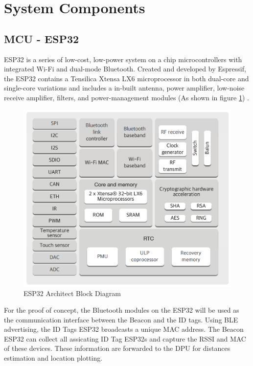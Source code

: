 

\setcounter{section}{2}
\section{System Components}
\bigskip

\subsection{MCU - ESP32}
\medskip
ESP32 is a series of low-cost, low-power system on a chip microcontrollers with integrated Wi-Fi and dual-mode Bluetooth. Created and developed by Espressif, the ESP32 contains a Tensilica Xtensa LX6 microprocessor in both dual-core and single-core variations and includes a in-built antenna, power amplifier, low-noise receive amplifier, filters, and power-management modules (As shown in figure \ref{esp_core}) \cite{R3-1-1}. 

\medskip
\begin{figure}[H]
\centering
    \includegraphics[scale=0.4]{./images/esp_core.png}
    \caption{ESP32 Architect Block Diagram}
    \label{esp_core}
\end{figure}

For the proof of concept, the Bluetooth modules on the ESP32 will be used as the communication interface between the Beacon and the ID tags. Using BLE advertising, the ID Tags ESP32 broadcasts a unique MAC address. The Beacon ESP32 can collect all assicating ID Tag ESP32s and capture the RSSI and MAC of these devices. These information are forwarded to the DPU for distances estimation and location plotting.

